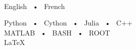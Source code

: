 \documentclass[lighthipster]{simplehipstercv}
\begin{document}
\begin{paracol}{2}
{\hfill{} \\

\vspace{-0.3cm}
\flushright
{
    English ~•~ French

    \bigskip

    Python ~•~ Cython ~•~ Julia ~•~ C++ \\ MATLAB ~•~ BASH ~•~ ROOT \\ \LaTeX
}







\bigskip



\vfill

\vspace{-0.5cm}

}
\end{paracol}
\end{document}
